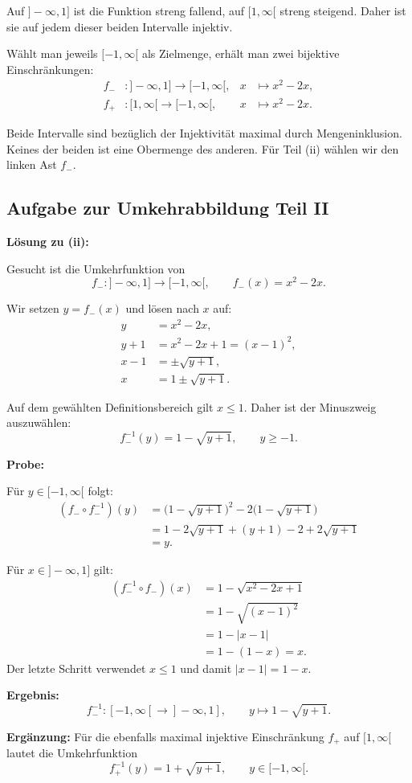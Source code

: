 Auf $]-\infty,1]$ ist die Funktion streng fallend,
auf $[1,\infty[$ streng steigend. Daher ist sie
auf jedem dieser beiden Intervalle injektiv.

Wählt man jeweils $[-1,\infty[$ als Zielmenge,
erhält man zwei bijektive Einschränkungen:
\begin{align*}
f_- &: ]-\infty,1]\rightarrow[-1,\infty[,
&x&\mapsto x^2-2x,\\
f_+ &: [1,\infty[\rightarrow[-1,\infty[,
&x&\mapsto x^2-2x.
\end{align*}

Beide Intervalle sind bezüglich der Injektivität
maximal durch Mengeninklusion.
Keines der beiden ist eine Obermenge des anderen.
Für Teil (ii) wählen wir den linken Ast $f_-$.

\subsection{Aufgabe zur Umkehrabbildung Teil II}

\textbf{Lösung zu (ii):}

Gesucht ist die Umkehrfunktion von
\[
f_-:]-\infty,1]\rightarrow[-1,\infty[,
\qquad f_-(x)=x^2-2x.
\]

Wir setzen $y=f_-(x)$ und lösen nach $x$ auf:
\begin{align*}
y &= x^2-2x,\\
y+1 &= x^2-2x+1=(x-1)^2,\\
x-1 &= \pm\sqrt{y+1},\\
x &= 1\pm\sqrt{y+1}.
\end{align*}

Auf dem gewählten Definitionsbereich gilt $x\leq 1$.
Daher ist der Minuszweig auszuwählen:
\[
\boxed{f_-^{-1}(y)=1-\sqrt{y+1},\qquad y\geq-1.}
\]

\textbf{Probe:}

Für $y\in[-1,\infty[$ folgt:
\begin{align*}
(f_-\circ f_-^{-1})(y)
 &=\bigl(1-\sqrt{y+1}\bigr)^2
   -2\bigl(1-\sqrt{y+1}\bigr)\\
 &=1-2\sqrt{y+1}+(y+1)-2+2\sqrt{y+1}\\
 &=y.
\end{align*}

Für $x\in]-\infty,1]$ gilt:
\begin{align*}
(f_-^{-1}\circ f_-)(x)
 &=1-\sqrt{x^2-2x+1}\\
 &=1-\sqrt{(x-1)^2}\\
 &=1-|x-1|\\
 &=1-(1-x)=x.
\end{align*}
Der letzte Schritt verwendet $x\leq 1$ und damit
$|x-1|=1-x$.

\textbf{Ergebnis:}
\[
\boxed{
f_-^{-1}:[-1,\infty[\rightarrow]-\infty,1],
\qquad y\mapsto1-\sqrt{y+1}.
}
\]

\textbf{Ergänzung:}
Für die ebenfalls maximal injektive Einschränkung
$f_+$ auf $[1,\infty[$ lautet die Umkehrfunktion
\[
f_+^{-1}(y)=1+\sqrt{y+1},
\qquad y\in[-1,\infty[.
\]
